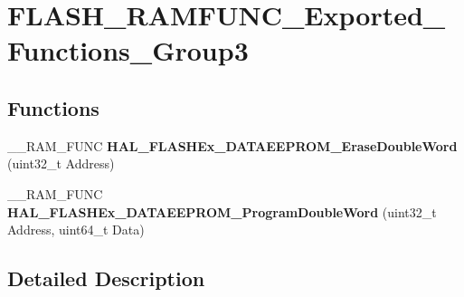 \hypertarget{group___f_l_a_s_h___r_a_m_f_u_n_c___exported___functions___group3}{\section{F\-L\-A\-S\-H\-\_\-\-R\-A\-M\-F\-U\-N\-C\-\_\-\-Exported\-\_\-\-Functions\-\_\-\-Group3}
\label{group___f_l_a_s_h___r_a_m_f_u_n_c___exported___functions___group3}
}
\subsection*{Functions}
\begin{DoxyCompactItemize}
\item 
\hypertarget{group___f_l_a_s_h___r_a_m_f_u_n_c___exported___functions___group3_ga9ff3ef9fca43c525ae0dce16a51d41ed}{\-\_\-\-\_\-\-R\-A\-M\-\_\-\-F\-U\-N\-C {\bfseries H\-A\-L\-\_\-\-F\-L\-A\-S\-H\-Ex\-\_\-\-D\-A\-T\-A\-E\-E\-P\-R\-O\-M\-\_\-\-Erase\-Double\-Word} (uint32\-\_\-t Address)}\label{group___f_l_a_s_h___r_a_m_f_u_n_c___exported___functions___group3_ga9ff3ef9fca43c525ae0dce16a51d41ed}

\item 
\hypertarget{group___f_l_a_s_h___r_a_m_f_u_n_c___exported___functions___group3_gac49c6ce2541445a10376544a2bfb81eb}{\-\_\-\-\_\-\-R\-A\-M\-\_\-\-F\-U\-N\-C {\bfseries H\-A\-L\-\_\-\-F\-L\-A\-S\-H\-Ex\-\_\-\-D\-A\-T\-A\-E\-E\-P\-R\-O\-M\-\_\-\-Program\-Double\-Word} (uint32\-\_\-t Address, uint64\-\_\-t Data)}\label{group___f_l_a_s_h___r_a_m_f_u_n_c___exported___functions___group3_gac49c6ce2541445a10376544a2bfb81eb}

\end{DoxyCompactItemize}


\subsection{Detailed Description}
